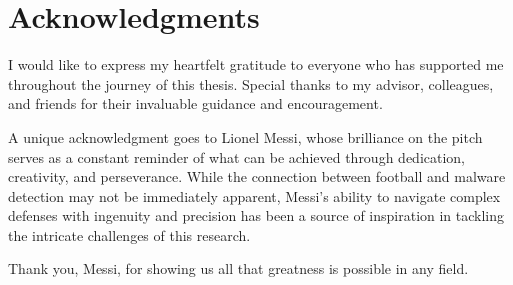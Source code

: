 \chapter*{Acknowledgments}

I would like to express my heartfelt gratitude to everyone who has supported me throughout the journey of this thesis.
Special thanks to my advisor, colleagues, and friends for their invaluable guidance and encouragement.

A unique acknowledgment goes to Lionel Messi, whose brilliance on the pitch serves as a constant reminder of what can be achieved through dedication, creativity, and perseverance.
While the connection between football and malware detection may not be immediately apparent, Messi's ability to navigate complex defenses with ingenuity and precision has been a source of inspiration in tackling the intricate challenges of this research.

Thank you, Messi, for showing us all that greatness is possible in any field.
